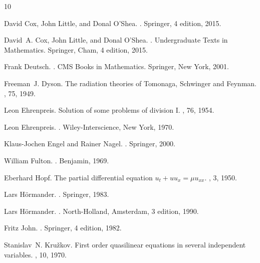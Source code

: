 \documentclass[11pt]{article}
\theoremstyle{plain}
\theoremstyle{definition}
\theoremstyle{remark}
\begin{document}
\begin{thebibliography}{10}

David Cox, John Little, and Donal O'Shea.
.
\newblock Springer, 4 edition, 2015.

David~A. Cox, John Little, and Donal O'Shea.
.
\newblock Undergraduate Texts in Mathematics. Springer, Cham, 4 edition, 2015.

Frank Deutsch.
.
\newblock CMS Books in Mathematics. Springer, New York, 2001.

Freeman~J. Dyson.
\newblock The radiation theories of {T}omonaga, {S}chwinger and {F}eynman.
, 75, 1949.

Leon Ehrenpreis.
\newblock Solution of some problems of division {I}.
, 76, 1954.

Leon Ehrenpreis.
.
\newblock Wiley-Interscience, New York, 1970.

Klaus-Jochen Engel and Rainer Nagel.
.
\newblock Springer, 2000.

William Fulton.
.
\newblock Benjamin, 1969.

Eberhard Hopf.
\newblock The partial differential equation $u_t+uu_x=\mu u_{xx}$.
, 3, 1950.

Lars H\"ormander.
.
\newblock Springer, 1983.

Lars H{\"o}rmander.
.
\newblock North-Holland, Amsterdam, 3 edition, 1990.

Fritz John.
.
\newblock Springer, 4 edition, 1982.

Stanislav~N. Kru\v{z}kov.
\newblock First order quasilinear equations in several independent variables.
, 10, 1970.


\end{thebibliography}
\end{document}
